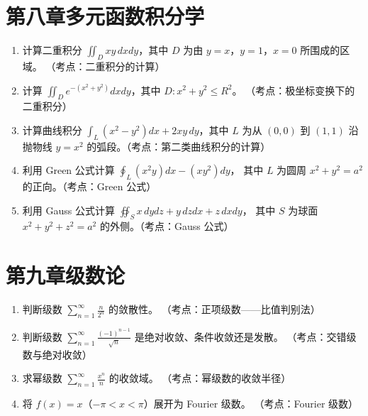 \documentclass[12pt,a4paper]{ctexart}
\begin{document}
\section*{第八章\quad 多元函数积分学}

\begin{enumerate}[leftmargin=*,label=\arabic*.,start=41]
  \item 计算二重积分 $\displaystyle\iint_D xy \,dxdy$，其中 $D$ 为由 $y=x$，$y=1$，$x=0$ 所围成的区域。
    （考点：二重积分的计算）

  \item 计算 $\displaystyle\iint_D e^{-(x^2+y^2)} dxdy$，其中 $D: x^2+y^2 \le R^2$。
    （考点：极坐标变换下的二重积分）

  \item 计算曲线积分 $\displaystyle\int_L (x^2-y^2)dx + 2xy\,dy$，其中 $L$ 为从 $(0,0)$ 到 $(1,1)$
    沿抛物线 $y=x^2$ 的弧段。（考点：第二类曲线积分的计算）

  \item 利用 Green 公式计算 $\displaystyle\oint_L (x^2y)dx - (xy^2)dy$，
    其中 $L$ 为圆周 $x^2+y^2 = a^2$ 的正向。（考点：Green 公式）

  \item 利用 Gauss 公式计算 $\displaystyle\oiint_S x\,dydz + y\,dzdx + z\,dxdy$，
    其中 $S$ 为球面 $x^2+y^2+z^2=a^2$ 的外侧。（考点：Gauss 公式）
\end{enumerate}

\section*{第九章\quad 级数论}

\begin{enumerate}[leftmargin=*,label=\arabic*.,start=46]
  \item 判断级数 $\displaystyle\sum_{n=1}^{\infty}\frac{n}{2^n}$ 的敛散性。
    （考点：正项级数——比值判别法）

  \item 判断级数 $\displaystyle\sum_{n=1}^{\infty}\frac{(-1)^{n-1}}{\sqrt{n}}$ 是绝对收敛、条件收敛还是发散。
    （考点：交错级数与绝对收敛）

  \item 求幂级数 $\displaystyle\sum_{n=1}^{\infty}\frac{x^n}{n}$ 的收敛域。
    （考点：幂级数的收敛半径）

  \item 将 $f(x) = x$（$-\pi < x < \pi$）展开为 Fourier 级数。
    （考点：Fourier 级数）
\end{enumerate}
\end{document}
